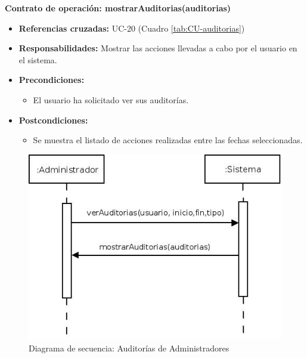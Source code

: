 \textbf{Contrato de operación: mostrarAuditorias(auditorias)}
\begin{itemize}
\item \textbf{Referencias cruzadas:} UC-20 (Cuadro \ref{tab:CU-auditorias})
\item \textbf{Responsabilidades:} Mostrar las acciones llevadas a cabo por el usuario en el sistema.
\item \textbf{Precondiciones:} 
 \begin{itemize}
\item El usuario ha solicitado ver sus auditorías.
\end {itemize}
\item \textbf{Postcondiciones:} 
 \begin{itemize}
\item Se muestra el listado de acciones realizadas entre las fechas seleccionadas.
\end {itemize}
\end {itemize}


\vspace{7mm}
\dotfill
\vspace{7mm}

\begin{figure}[h!]
\centering
  \includegraphics[scale=.55]{img/secuencias/auditorias-administrador.jpeg}
  \caption{Diagrama de secuencia: Auditorías de Administradores}
  \label{fig:secuencia-auditorias-administrador}
\end{figure}

